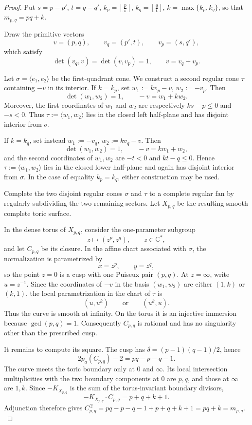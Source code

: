 \documentclass[10pt,a4paper]{amsart}
\newcommand{\C}{\mathbb C}
\begin{document}
\begin{proof}
Put
$s=p-p'$,
 $t=q-q'$,
 $k_p=\left\lfloor\frac ps\right\rfloor$,
 $k_q=\left\lfloor\frac qt\right\rfloor$,
$k=\max\{k_p,k_q\}$,
so that 
$m_{p,q}=pq+k$.

Draw the primitive vectors
\[
 v=(p,q),\qquad v_q=(p',t),\qquad v_p=(s,q'),
\]
which satisfy
\[
 \det(v_q,v)=\det(v,v_p)=1,
 \qquad v=v_q+v_p.
\]

Let $\sigma=\langle e_1,e_2\rangle$ be the first-quadrant cone.  We construct
a second regular cone $\tau$ containing $-v$ in its interior.
If $k=k_p$, set
$w_1:=k v_p-v$,
$w_2:=-v_p$.
Then
\[
 \det(w_1,w_2)=1,
 \qquad -v=w_1+k w_2.
\]
Moreover, the first coordinates of $w_1$ and $w_2$ are respectively
$ks-p\le0$ and $-s<0$.  Thus $\tau:=\langle w_1,w_2\rangle$ lies in the
closed left half-plane and has disjoint interior from $\sigma$.

If $k=k_q$, set instead
$
 w_1:=-v_q$,
 $w_2:=k v_q-v$.
Then
\[
 \det(w_1,w_2)=1,
 \qquad -v=k w_1+w_2,
\]
and the second coordinates of $w_1,w_2$ are $-t<0$ and $kt-q\le0$.
Hence $\tau:=\langle w_1,w_2\rangle$ lies in the closed lower half-plane and
again has disjoint interior from $\sigma$.  In the case of equality
$k_p=k_q$, either construction may be used.

Complete the two disjoint regular cones $\sigma$ and $\tau$ to a complete
regular fan by regularly subdividing the two remaining sectors.  Let
$X_{p,q}$ be the resulting smooth complete toric surface.

In the dense torus of $X_{p,q}$, consider the one-parameter subgroup
\[
 z\longmapsto (z^p,z^q),\qquad z\in\C^*,
\]
and let $C_{p,q}$ be its closure.  In the affine chart associated with
$\sigma$, the normalization is parametrized by
\[
 x=z^p,\qquad y=z^q,
\]
so the point $z=0$ is a cusp with one Puiseux pair $(p,q)$.  At $z=\infty$,
write $u=z^{-1}$.  Since the coordinates of $-v$ in the basis
$(w_1,w_2)$ are either $(1,k)$ or $(k,1)$, the local parametrization in the
chart of $\tau$ is
\[
 (u,u^k)\qquad\text{or}\qquad(u^k,u).
\]
Thus the curve is smooth at infinity.  On the torus it is an injective
immersion because $\gcd(p,q)=1$.  Consequently $C_{p,q}$ is rational and
has no singularity other than the prescribed cusp.

It remains to compute its square.  The cusp has
$\delta=(p-1)(q-1)/2$, hence
\[
 2p_a(C_{p,q})-2=pq-p-q-1.
\]
The curve meets the toric boundary only at $0$ and $\infty$.  Its local
intersection multiplicities with the two boundary components at $0$ are
$p,q$, and those at $\infty$ are $1,k$.  Since
$-K_{X_{p,q}}$ is the sum of the torus-invariant boundary divisors,
\[
 -K_{X_{p,q}}\cdot C_{p,q}=p+q+k+1.
\]
Adjunction therefore gives
$
 C_{p,q}^{\,2}
 =pq-p-q-1+p+q+k+1
 =pq+k
 =m_{p,q}.
$
\end{proof}
\end{document}
